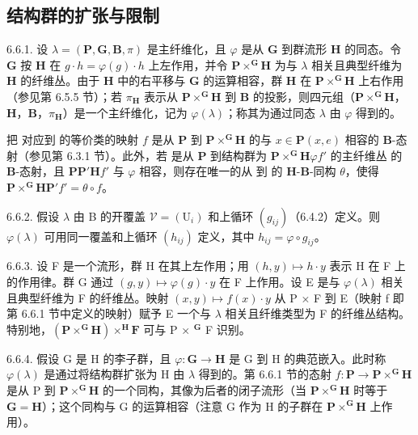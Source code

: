 \subsection{结构群的扩张与限制}

6.6.1. 设 \(\lambda = (\mathbf{P}, \mathbf{G}, \mathbf{B}, \pi)\) 是主纤维化，且 \(\varphi\) 是从 \(\mathbf{G}\) 到群流形 \(\mathbf{H}\) 的同态。令 \(\mathbf{G}\) 按 \(\mathbf{H}\) 在 \(g \cdot h = \varphi(g) \cdot h\) 上左作用，并令 \(\mathbf{P} \times^{\mathbf{G}} \mathbf{H}\) 为与 \(\lambda\) 相关且典型纤维为 \(\mathbf{H}\) 的纤维丛。由于 \(\mathbf{H}\) 中的右平移与 \(\mathbf{G}\) 的运算相容，群 \(\mathbf{H}\) 在 \(\mathbf{P} \times^{\mathbf{G}} \mathbf{H}\) 上右作用（参见第 6.5.5 节）；若 \(\pi_{\mathbf{H}}\) 表示从 \(\mathbf{P} \times^{\mathbf{G}} \mathbf{H}\) 到 \(\mathbf{B}\) 的投影，则四元组（\(\mathbf{P} \times^{\mathbf{G}} \mathbf{H}\)，\(\mathbf{H}\)，\(\mathbf{B}\)，\(\pi_{\mathbf{H}}\)）是一个主纤维化，记为 \(\varphi(\lambda)\)；称其为通过同态 \(\lambda\) 由 \(\varphi\) 得到的。

把  对应到  的等价类的映射 \(f\) 是从 \(\mathbf{P}\) 到 \(\mathbf{P} \times^{\mathbf{G}}\mathbf{H}\) 的与 \(x \in \mathbf{P}\)\((x, e)\) 相容的 \(\mathbf{B}\)-态射（参见第 6.3.1 节）。此外，若  是从 \(\mathbf{P}\) 到结构群为 \(\mathbf{P} \times^{\mathbf{G}}\mathbf{H}\)\(\varphi\)\(f'\) 的主纤维丛  的 \(\mathbf{B}\)-态射，且 \(\mathbf{P}\)\(\mathbf{P}'\)\(\mathbf{H}\)\(f'\) 与 \(\varphi\) 相容，则存在唯一的从  到  的 \(\mathbf{H}\)-\(\mathbf{B}\)-同构 \(\theta\)，使得 \(\mathbf{P} \times^{\mathbf{G}}\mathbf{H}\)\(\mathbf{P}'\)\(f' = \theta \circ f\)。

6.6.2. 假设 \(\lambda\) 由 B 的开覆盖 \(\mathcal{V} = (\mathrm{U}_i)\) 和上循环 \((g_{ij})\)（6.4.2）定义。则 \(\varphi(\lambda)\) 可用同一覆盖和上循环 \((h_{ij})\) 定义，其中 \(h_{ij} = \varphi \circ g_{ij}\)。

6.6.3. 设 F 是一个流形，群 H 在其上左作用；用 \((h, y) \mapsto h \cdot y\) 表示 H 在 F 上的作用律。群 G 通过 \((g, y) \mapsto \varphi(g) \cdot y\) 在 F 上作用。设 E 是与 \(\varphi(\lambda)\) 相关且典型纤维为 F 的纤维丛。映射 \((x, y) \mapsto f(x) \cdot y\) 从 P × F 到 E（映射 f 即第 6.6.1 节中定义的映射）赋予 E 一个与 \(\lambda\) 相关且纤维类型为 F 的纤维丛结构。特别地，\((\mathbf{P} \times^{\mathbf{G}}\mathbf{H}) \times^{\mathbf{H}}\mathbf{F}\) 可与 P × \(^{\mathbf{G}}\) F 识别。

6.6.4. 假设 G 是 H 的李子群，且 \(\varphi: \mathbf{G} \to \mathbf{H}\) 是 G 到 H 的典范嵌入。此时称 \(\varphi(\lambda)\) 是通过将结构群扩张为 H 由 \(\lambda\) 得到的。第 6.6.1 节的态射 \(f: \mathbf{P} \to \mathbf{P} \times^{\mathbf{G}} \mathbf{H}\) 是从 P 到 \(\mathbf{P} \times^{\mathbf{G}} \mathbf{H}\) 的一个同构，其像为后者的闭子流形（当 \(\mathbf{P} \times^{\mathbf{G}} \mathbf{H}\) 时等于 \(\mathbf{G} = \mathbf{H}\)）；这个同构与 G 的运算相容（注意 G 作为 H 的子群在 \(\mathbf{P} \times^{\mathbf{G}} \mathbf{H}\) 上作用）。

